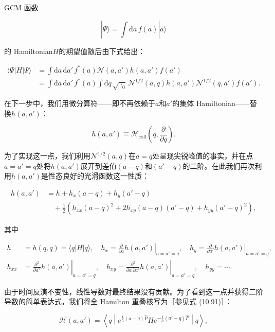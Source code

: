 GCM 函数

\begin{equation}
|\Psi\rangle=\int\mathrm{d}a\,f(a)|a\rangle\label{eq:10.121}
\end{equation}

的 Hamiltonian$H$的期望值随后由下式给出：

\begin{align}
\langle\Psi|H|\Psi\rangle & =\int\mathrm{d}a\,\mathrm{d}a'\,f^{*}(a)\mathscr{N}(a,a')h(a,a')f(a')\nonumber \\
 & =\int\mathrm{d}a\,\mathrm{d}a'\,f^{*}(a)\int\mathrm{d}q\,\sqrt{\gamma_{0}}\,\mathscr{N}^{1/2}(a,q)h(a,a')\mathscr{N}^{1/2}(q,a')f(a').\label{eq:10.122}
\end{align}

在下一步中，我们用微分算符——即不再依赖于$a$和$a'$的集体 Hamiltonian——替换$h(a,a')$：

\begin{equation}
h(a,a')\mathrel{\hat{=}}\mathscr{H}_{\mathrm{coll}}\left(q,\frac{\partial}{\partial q}\right).\label{eq:10.123}
\end{equation}

为了实现这一点，我们利用$\mathscr{N}^{1/2}(a,q)$在$a=q$处呈现尖锐峰值的事实，并在点$a=a'=q$处将$h(a,a')$展开到差值$(a-q)$和$(a'-q)$的二阶。在此我们再次利用$h(a,a')$是性态良好的光滑函数这一性质：

\begin{align}
h(a,a') & =h+h_{x}(a-q)+h_{y}(a'-q)\nonumber \\
 & \quad+\frac{1}{2}\left(h_{xx}(a-q)^{2}+2h_{xy}(a-q)(a'-q)+h_{yy}(a'-q)^{2}\right),\label{eq:10.124}
\end{align}

其中

\begin{align}
h & =h(q,q)=\langle q|H|q\rangle,\quad h_{x}=\left.\frac{\partial}{\partial a}h(a,a')\right|_{a=a'=q},\quad h_{y}=\left.\frac{\partial}{\partial a'}h(a,a')\right|_{a=a'=q},\nonumber \\
h_{xx} & =\left.\frac{\partial^{2}}{\partial a^{2}}h(a,a')\right|_{a=a'=q},\quad h_{xy}=\left.\frac{\partial^{2}}{\partial a\,\partial a'}h(a,a')\right|_{a=a'=q},\quad h_{yy}=\cdots.\label{eq:10.125}
\end{align}

由于时间反演不变性，线性导数对最终结果没有贡献。为了看到这一点并获得二阶导数的简单表达式，我们将全 Hamilton 重叠核写为［参见式
(10.91)］：

\begin{equation}
\mathscr{H}(a,a')=\left\langle q\middle|e^{\frac{\mathrm{i}}{\hbar}(a-q)\hat{P}}He^{-\frac{\mathrm{i}}{\hbar}(a'-q)\hat{P}}\middle|q\right\rangle ,\label{eq:10.126}
\end{equation}

